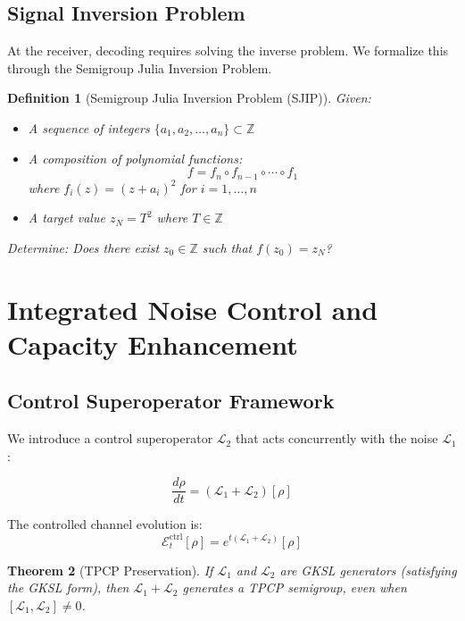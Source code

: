 \documentclass[12pt,a4paper]{article}
\newtheorem{theorem}{Theorem}[section]
\newtheorem{definition}[theorem]{Definition}
\newcommand{\Z}{\mathbb{Z}}
\begin{document}
\subsection{Signal Inversion Problem}

At the receiver, decoding requires solving the inverse problem. We formalize this through the Semigroup Julia Inversion Problem.

\begin{definition}[Semigroup Julia Inversion Problem (SJIP)]
\label{def:sjip}
Given:
\begin{itemize}
\item A sequence of integers $\{a_1, a_2, \ldots, a_n\} \subset \Z$
\item A composition of polynomial functions:
\begin{equation}
f = f_n \circ f_{n-1} \circ \cdots \circ f_1
\end{equation}
where $f_i(z) = (z + a_i)^2$ for $i = 1, \ldots, n$
\item A target value $z_N = T^2$ where $T \in \Z$
\end{itemize}
Determine: Does there exist $z_0 \in \Z$ such that $f(z_0) = z_N$?
\end{definition}

\section{Integrated Noise Control and Capacity Enhancement}

\subsection{Control Superoperator Framework}

We introduce a control superoperator $\mathcal{L}_2$ that acts concurrently with the noise $\mathcal{L}_1$:

\begin{equation}
\frac{d\rho}{dt} = (\mathcal{L}_1 + \mathcal{L}_2)[\rho]
\end{equation}

The controlled channel evolution is:
\begin{equation}
\mathcal{E}_t^{\text{ctrl}}[\rho] = e^{t(\mathcal{L}_1 + \mathcal{L}_2)}[\rho]
\end{equation}

\begin{theorem}[TPCP Preservation]
If $\mathcal{L}_1$ and $\mathcal{L}_2$ are GKSL generators (satisfying the GKSL form), then $\mathcal{L}_1 + \mathcal{L}_2$ generates a TPCP semigroup, even when $[\mathcal{L}_1, \mathcal{L}_2] \neq 0$.
\end{theorem}
\end{document}
